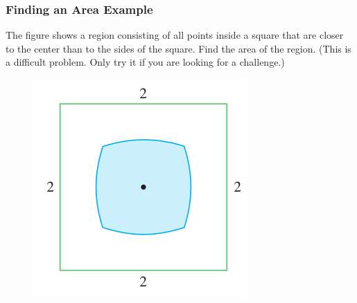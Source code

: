 \documentclass[xcolor=dvipsnames]{beamer}
\begin{document}
\begin{frame}
  \frametitle{Finding an Area Example}
  {\ubung} The figure shows a region consisting of all points inside a
  square that are closer to the center than to the sides of the
  square. Find the area of the region. (This is a difficult problem.
  Only try it if you are looking for a challenge.)
  \begin{figure}[h]
    \includegraphics[scale=0.5]{./diagrams/squarish.png}
  \end{figure}
\end{frame}

\end{document}
